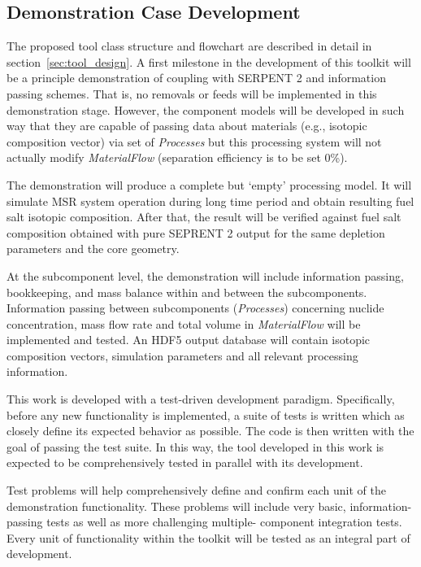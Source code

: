 \subsection{Demonstration Case Development}
The proposed tool class structure and flowchart are 
described in detail in section~\ref{sec:tool_design}.
A first milestone in the development of this toolkit will be a 
principle demonstration of coupling with SERPENT 2 and 
information passing schemes. That is, no removals or feeds 
will be implemented in this demonstration stage. However, 
the component models will be developed in such way that 
they are capable of passing data about materials (e.g., isotopic 
composition vector) via set of \textit{Processes} but this 
processing system will not actually modify \textit{MaterialFlow} 
(separation efficiency is to be set 0\%).

The demonstration will produce a complete but `empty' processing 
model. It will simulate \gls{MSR} system operation during 
long time period and obtain resulting fuel salt isotopic composition. 
After that, the result will be verified against fuel salt 
composition obtained with pure SEPRENT 2 output for the same 
depletion parameters and the core geometry.%

At the subcomponent level, the demonstration will include information 
passing, bookkeeping, and mass balance within and between the 
subcomponents. Information passing between subcomponents 
(\textit{Processes}) concerning nuclide concentration, mass flow rate 
and total volume in \textit{MaterialFlow} will be implemented and tested. 
An HDF5 output database will contain 
isotopic composition vectors, simulation 
parameters and all relevant processing information.

This work is developed with a test-driven development paradigm. 
Specifically, before any new functionality is implemented, a suite of 
tests is written which as closely define its expected behavior as 
possible. The code is then written with the goal of passing the test 
suite. In this way, the tool developed in this work is expected to be
comprehensively tested in parallel with its development.

Test problems will help comprehensively define and confirm each unit 
of the demonstration functionality. These problems will include very 
basic, information-passing tests as well as more challenging multiple-
component integration tests. Every unit of functionality
within the toolkit will be tested as an integral part of development.

